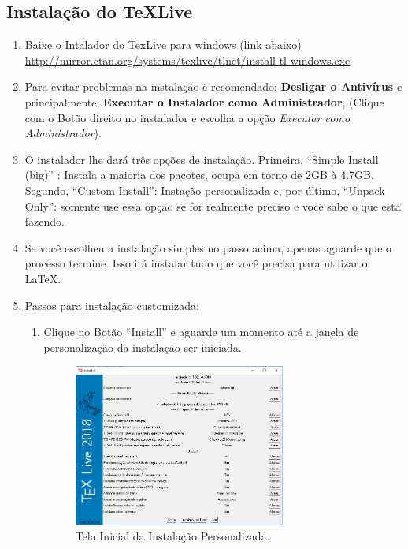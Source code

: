 \subsection*{Instalação do TeXLive}
\begin{enumerate}
	\item	Baixe o Intalador do TexLive para windows (link abaixo)\\
	      \href{http://mirror.ctan.org/systems/texlive/tlnet/install-tl-windows.exe}{http://mirror.ctan.org/systems/texlive/tlnet/install-tl-windows.exe}

	\item Para evitar problemas na instalação é recomendado: \textbf{Desligar o Antivírus} e principalmente, \textbf{Executar o Instalador como Administrador}, (Clique com o Botão direito no instalador e escolha a opção \textit{Executar como Administrador}).

	\item O instalador lhe dará três opções de instalação. Primeira, ``Simple Install (big)'' : Instala a maioria dos pacotes, ocupa em torno de 2GB à 4.7GB. Segundo, ``Custom Install'': Instação personalizada e, por último, ``Unpack Only'': somente use essa opção se for realmente preciso e você sabe o que está fazendo.
	\item Se você escolheu a instalação simples no passo acima, apenas aguarde que o processo termine. Isso irá instalar tudo que você precisa para utilizar o \LaTeX.
	\item Passos para instalação customizada:
	      \begin{enumerate}
		      \item Clique no Botão ``Install'' e aguarde um momento até a janela de personalização da instalação ser iniciada. \\
		            \begin{figure}[htbp!]
			            \centering
			            \includegraphics[width=0.7\textwidth]{Appendix1/Figs/install-tl-01.png}
			            \caption[Instação Personalizaa]{Tela Inicial da Instalação Personalizada.}
			            \label{fig:install-tl-01}
                    \end{figure}


\end{enumerate}
\end{enumerate}
